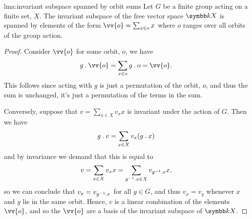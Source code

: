 \begin{lma}{}{lma:invariant subspace spanned by orbit sums}
    Let \(G\) be a finite group acting on a finite set, \(X\).
    The invariant subspace of the free vector space \(\field X\) is spanned by elements of the form \(\vv{o} = \sum_{x \in o} x\) where \(o\) ranges over all orbits of the group action.
    \begin{proof}
        Consider \(\vv{o}\) for some orbit, \(o\), we have
        \begin{equation}
            g \action \vv{o} = \sum_{x \in o} g \action o = \vv{o}.
        \end{equation}
        This follows since acting with \(g\) is just a permutation of the orbit, \(o\), and thus the sum is unchanged, it's just a permutation of the terms in the sum.
        
        Conversely, suppose that \(v = \sum_{x \in X} v_x x\) is invariant under the action of \(G\).
        Then we have
        \begin{equation}
            g \mathbin{.} v = \sum_{x \in X} v_x (g \mathbin{.} x)
        \end{equation}
        and by invariance we demand that this is equal to
        \begin{equation}
            v = \sum_{x \in X} v_x x = \sum_{g^{-1}\mathbin{.} x \in X} v_{g^{-1} \mathbin{.} x} x,
        \end{equation}
        so we can conclude that \(v_x = v_{g^{-1} \mathbin{.} x}\) for all \(g \in G\), and thus \(v_x = v_y\) whenever \(x\) and \(y\) lie in the same orbit.
        Hence, \(v\) is a linear combination of the elements \(\vv{o}\), and so the \(\vv{o}\) are a basis of the invariant subspace of \(\field X\).
    \end{proof}
\end{lma}

